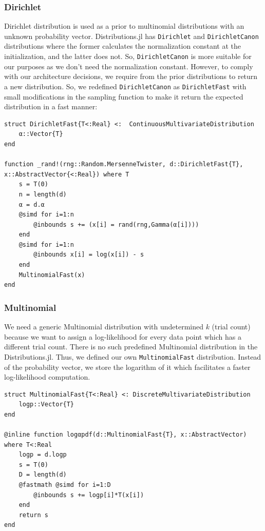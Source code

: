 \documentclass[12pt, a4paper]{article}
\newenvironment{code}{\captionsetup{type=listing}}{}
\begin{document}
\subsubsection{Dirichlet}
Dirichlet distribution is used as a prior to multinomial distributions with an unknown probability vector. Distributions.jl has \texttt{Dirichlet} and \texttt{DirichletCanon} distributions where the former calculates the normalization constant at the initialization, and the latter does not. So, \texttt{DirichletCanon} is more suitable for our purposes as we don't need the normalization constant. However, to comply with our architecture decisions, we require from the prior distributions to return a new distribution. So, we redefined \texttt{DirichletCanon} as \texttt{DirichletFast} with small modifications in the sampling function to make it return the expected distribution in a fast manner:
\begin{code}
\label{code:dirichlet}
\begin{verbatim}
struct DirichletFast{T<:Real} <:  ContinuousMultivariateDistribution
    α::Vector{T}
end

function _rand!(rng::Random.MersenneTwister, d::DirichletFast{T}, x::AbstractVector{<:Real}) where T
    s = T(0)
    n = length(d)
    α = d.α
    @simd for i=1:n
        @inbounds s += (x[i] = rand(rng,Gamma(α[i])))
    end
    @simd for i=1:n
        @inbounds x[i] = log(x[i]) - s
    end
    MultinomialFast(x)
end
\end{verbatim}
\end{code}

\subsubsection{Multinomial}
We need a generic Multinomial distribution with undetermined $k$ (trial count) because we want to assign a log-likelihood for every data point which has a different trial count. There is no such predefined Multinomial distribution in the Distributions.jl. Thus, we defined our own \texttt{MultinomialFast} distribution. Instead of the probability vector, we store the logarithm of it which facilitates a faster log-likelihood computation.
\begin{code}
\label{code:multinomialfast}
\begin{verbatim}
struct MultinomialFast{T<:Real} <: DiscreteMultivariateDistribution
    logp::Vector{T}
end

@inline function logαpdf(d::MultinomialFast{T}, x::AbstractVector) where T<:Real
    logp = d.logp
    s = T(0)
    D = length(d)
    @fastmath @simd for i=1:D
        @inbounds s += logp[i]*T(x[i])
    end
    return s
end
\end{verbatim}
\end{code}
\end{document}
